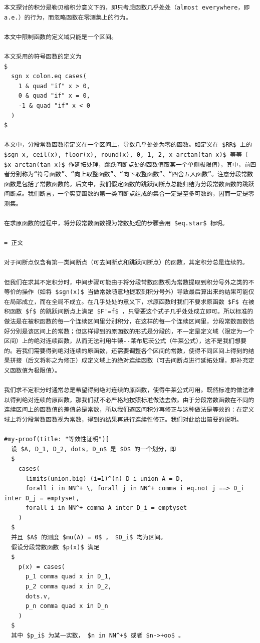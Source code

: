 \begin{verbatim}
本文探讨的积分是勒贝格积分意义下的，即只考虑函数几乎处处（almost everywhere，即a.e.）的行为，而忽略函数在零测集上的行为。

本文中限制函数的定义域只能是一个区间。

本文采用的符号函数的定义为
$
  sgn x colon.eq cases(
    1 & quad "if" x > 0,
    0 & quad "if" x = 0,
    -1 & quad "if" x < 0
  )
$

本文中，分段常数函数指定义在一个区间上，导数几乎处处为零的函数。如定义在 $RR$ 上的 $sgn x, ceil(x), floor(x), round(x), 0, 1, 2, x-arctan(tan x)$ 等等（ $x-arctan(tan x)$ 作延拓处理，跳跃间断点处的函数值取某一个单侧极限值），其中，前四者分别称为“符号函数”、“向上取整函数”、“向下取整函数”、“四舍五入函数”。注意分段常数函数是包括了常数函数的。后文中，我们假定函数的跳跃间断点总能归结为分段常数函数的跳跃间断点。我们断言，一个实变函数的第一类间断点组成的集合一定是至多可数的，因而一定是零测集。

在求原函数的过程中，将分段常数函数视为常数处理的步骤会用 $eq.star$ 标明。

= 正文

对于间断点仅含有第一类间断点（可去间断点和跳跃间断点）的函数，其定积分总是连续的。

但我们在求其不定积分时，中间步骤可能由于将分段常数函数视为常数提取到积分号外之类的不等价的操作（如将 $sgn(x)$ 当做常数随意地提取到积分号外）导致最后算出来的结果可能仅在局部成立，而在全局不成立。在几乎处处的意义下，求原函数时我们不要求原函数 $F$ 在被积函数 $f$ 的跳跃间断点上满足 $F'=f$ ，只需要这个式子几乎处处成立即可。所以标准的做法是在被积函数的每一个连续区间里分别积分，在这样的每一个连续区间里，分段常数函数恰好分别是该区间上的常数；但这样得到的原函数的形式是分段的，不一定是定义域（限定为一个区间）上的绝对连续函数，从而无法利用牛顿--莱布尼茨公式（牛莱公式），这不是我们想要的。若我们需要得到绝对连续的原函数，还需要调整各个区间的常数，使得不同区间上得到的结果拼接（后文将称之为修正）成定义域上的绝对连续函数（可去间断点进行延拓处理，即补充定义函数值为极限值）。

我们求不定积分时通常总是希望得到绝对连续的原函数，使得牛莱公式可用。既然标准的做法难以得到绝对连续的原函数，那我们就不必严格地按照标准做法去做。由于分段常数函数在不同的连续区间上的函数值的差值总是常数，所以我们逐区间积分再修正与这种做法是等效的：在定义域上将分段常数函数视为常数，得到的结果再进行连续性修正。我们对此给出简要的说明。

#my-proof(title: "等效性证明")[
  设 $A, D_1, D_2, dots, D_n$ 是 $D$ 的一个划分，即
  $
    cases(
      limits(union.big)_(i=1)^(n) D_i union A = D,
      forall i in NN^+ \, forall j in NN^+ comma i eq.not j ==> D_i inter D_j = emptyset,
      forall i in NN^+ comma A inter D_i = emptyset
    )
  $
  并且 $A$ 的测度 $mu(A) = 0$ ， $D_i$ 均为区间。
  假设分段常数函数 $p(x)$ 满足
  $
    p(x) = cases(
      p_1 comma quad x in D_1,
      p_2 comma quad x in D_2,
      dots.v,
      p_n comma quad x in D_n
    )
  $
  其中 $p_i$ 为某一实数， $n in NN^+$ 或者 $n->+oo$ 。


\end{verbatim}
